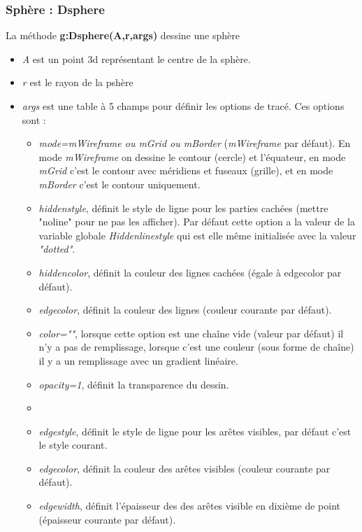 \subsubsection{ Sphère : Dsphere}

La méthode \textbf{g:Dsphere(A,r,args)} dessine une sphère

\begin{itemize}
    \item \emph{A} est un point 3d représentant le centre de la sphère.
    \item \emph{r} est le rayon de la pshère
    \item \emph{args} est une table à 5 champs pour définir les options de tracé. Ces options sont :
        \begin{itemize}
            \item \emph{mode=mWireframe ou mGrid ou mBorder} (\emph{mWireframe} par défaut). En mode \emph{mWireframe} on dessine le contour (cercle) et l'équateur, en mode \emph{mGrid} c'est le contour avec méridiens et fuseaux (grille), et en mode \emph{mBorder} c'est le contour uniquement.
            \item \emph{hiddenstyle}, définit le style de ligne pour les parties cachées (mettre "noline" pour ne pas les afficher). Par défaut cette option a la valeur de la variable globale \emph{Hiddenlinestyle} qui est elle même initialisée avec la valeur \emph{"dotted"}.
            \item \emph{hiddencolor}, définit la couleur des lignes cachées (égale à edgecolor par défaut).
            \item \emph{edgecolor}, définit la couleur des lignes (couleur courante par défaut).
            \item \emph{color=""}, lorsque cette option est une chaîne vide (valeur par défaut) il n'y a pas de remplissage,  lorsque c'est une couleur (sous forme de chaîne) il y a un remplissage avec un gradient linéaire.
            \item \emph{opacity=1}, définit la transparence du dessin.
            \item \item \emph{edgestyle}, définit le style de ligne pour les arêtes visibles, par défaut c'est le style courant.
            \item \emph{edgecolor}, définit la couleur des arêtes visibles (couleur courante par défaut).
            \item \emph{edgewidth}, définit l'épaisseur des des arêtes visible en dixième de point (épaisseur courante par défaut).
        \end{itemize}
\end{itemize}


